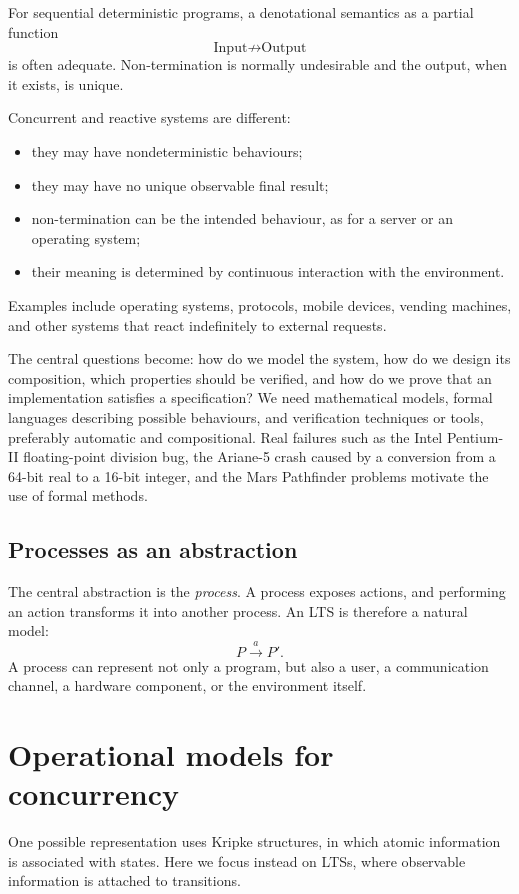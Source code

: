 \documentclass[a4paper]{article}
\newcommand{\trans}[1]{\xrightarrow{#1}}
\begin{document}
For sequential deterministic programs, a denotational semantics as a partial function
\[
    \text{Input}\not\to\text{Output}
\]
is often adequate.
Non-termination is normally undesirable and the output, when it exists, is unique.

Concurrent and reactive systems are different:
\begin{itemize}
    \item they may have nondeterministic behaviours;
    \item they may have no unique observable final result;
    \item non-termination can be the intended behaviour, as for a server or an operating system;
    \item their meaning is determined by continuous interaction with the environment.
\end{itemize}

Examples include operating systems, protocols, mobile devices, vending machines, and other systems that react indefinitely to external requests.

The central questions become: how do we model the system, how do we design its composition, which properties should be verified, and how do we prove that an implementation satisfies a specification?
We need mathematical models, formal languages describing possible behaviours, and verification techniques or tools, preferably automatic and compositional.
Real failures such as the Intel Pentium-II floating-point division bug, the Ariane-5 crash caused by a conversion from a 64-bit real to a 16-bit integer, and the Mars Pathfinder problems motivate the use of formal methods.

\subsection{Processes as an abstraction}

The central abstraction is the \emph{process}.
A process exposes actions, and performing an action transforms it into another process.
An LTS is therefore a natural model:
\[
    P\trans{a}P'.
\]
A process can represent not only a program, but also a user, a communication channel, a hardware component, or the environment itself.

\section{Operational models for concurrency}

One possible representation uses Kripke structures, in which atomic information is associated with states.
Here we focus instead on LTSs, where observable information is attached to transitions.
\end{document}
